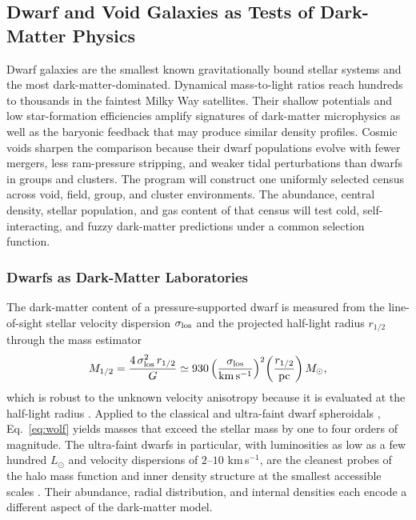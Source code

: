 \subsection{Dwarf and Void Galaxies as Tests of Dark-Matter Physics}\label{sec:dwarfvoid}

Dwarf galaxies are the smallest known gravitationally bound stellar systems and the most dark-matter-dominated. Dynamical mass-to-light ratios reach hundreds to thousands in the faintest Milky Way satellites. Their shallow potentials and low star-formation efficiencies amplify signatures of dark-matter microphysics as well as the baryonic feedback that may produce similar density profiles. Cosmic voids sharpen the comparison because their dwarf populations evolve with fewer mergers, less ram-pressure stripping, and weaker tidal perturbations than dwarfs in groups and clusters. The program will construct one uniformly selected census across void, field, group, and cluster environments. The abundance, central density, stellar population, and gas content of that census will test cold, self-interacting, and fuzzy dark-matter predictions under a common selection function.

\subsubsection{Dwarfs as Dark-Matter Laboratories}

The dark-matter content of a pressure-supported dwarf is measured from the line-of-sight stellar velocity dispersion $\sigma_{\rm los}$ and the projected half-light radius $r_{1/2}$ through the mass estimator
\begin{equation}
M_{1/2}=\frac{4\,\sigma_{\rm los}^2\,r_{1/2}}{G}\simeq930\left(\frac{\sigma_{\rm los}}{\rm km\,s^{-1}}\right)^{2}\!\left(\frac{r_{1/2}}{\rm pc}\right)M_\odot,
\label{eq:wolf}
\end{equation}
which is robust to the unknown velocity anisotropy because it is evaluated at the half-light radius \cite{wolf2010}. Applied to the classical and ultra-faint dwarf spheroidals \cite{mateo1998}, Eq.~\eqref{eq:wolf} yields masses that exceed the stellar mass by one to four orders of magnitude. The ultra-faint dwarfs in particular, with luminosities as low as a few hundred $L_\odot$ and velocity dispersions of $2$--$10$ km\,s$^{-1}$, are the cleanest probes of the halo mass function and inner density structure at the smallest accessible scales \cite{simon2019}. Their abundance, radial distribution, and internal densities each encode a different aspect of the dark-matter model.

